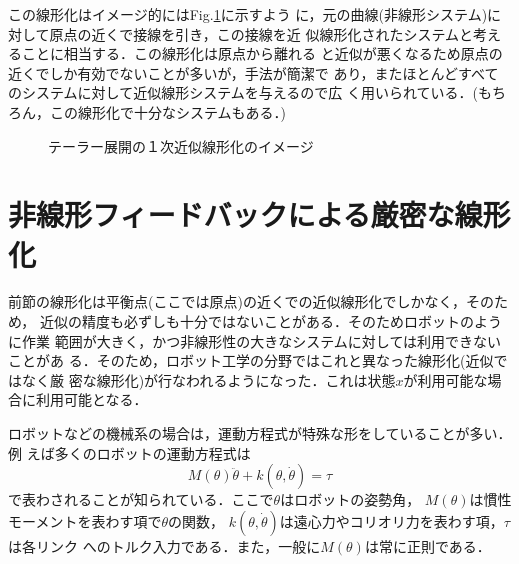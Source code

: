 この線形化はイメージ的にはFig.\ref{image_taylor_linearization}に示すよう
に，元の曲線(非線形システム)に対して原点の近くで接線を引き，この接線を近
似線形化されたシステムと考えることに相当する．この線形化は原点から離れる
と近似が悪くなるため原点の近くでしか有効でないことが多いが，手法が簡潔で
あり，またほとんどすべてのシステムに対して近似線形システムを与えるので広
く用いられている．(もちろん，この線形化で十分なシステムもある．)

\begin{figure}[htbp]
 \begin{center}
  \caption{テーラー展開の一次近似線形化を用いた制御系}
  \label{block_taylor_linearization}
 \end{center}
 \begin{center}
  \caption{テーラー展開の１次近似線形化のイメージ}
  \label{image_taylor_linearization}
 \end{center}
\end{figure}

\section{非線形フィードバックによる厳密な線形化}
前節の線形化は平衡点(ここでは原点)の近くでの近似線形化でしかなく，そのため，
近似の精度も必ずしも十分ではないことがある．そのためロボットのように作業
範囲が大きく，かつ非線形性の大きなシステムに対しては利用できないことがあ
る．そのため，ロボット工学の分野ではこれと異なった線形化(近似ではなく厳
密な線形化)が行なわれるようになった．これは状態$x$が利用可能な場合に利用可能となる．

ロボットなどの機械系の場合は，運動方程式が特殊な形をしていることが多い．例
えば多くのロボットの運動方程式は
\begin{equation}
 M(\theta) \ddot{\theta} + k(\theta, \dot{\theta}) = \tau
  \label{2_link_robot}
\end{equation}
で表わされることが知られている．ここで$\theta$はロボットの姿勢角，
$M(\theta)$は慣性モーメントを表わす項で$\theta$の関数，
$k(\theta, \dot{\theta})$は遠心力やコリオリ力を表わす項，$\tau$は各リンク
へのトルク入力である．また，一般に$M(\theta)$は常に正則である．

